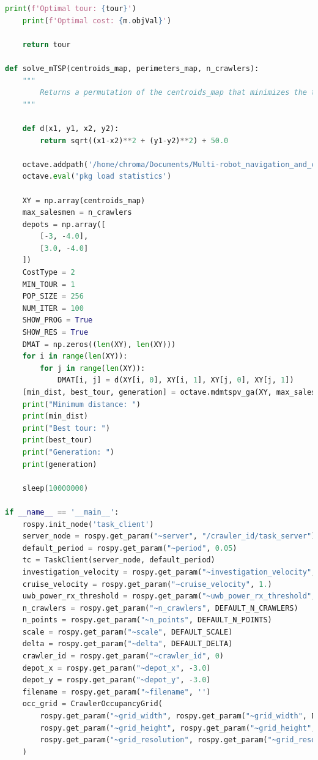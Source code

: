 \documentclass[francais,RandD]{rapportPFE}
\begin{document}
\begin{lstlisting}[language=Python,caption={Implémentation de l'algorithme d'investigation polygonale},label=lst:investigation_polygonale]
	print(f'Optimal tour: {tour}')
	print(f'Optimal cost: {m.objVal}')

	return tour

def solve_mTSP(centroids_map, perimeters_map, n_crawlers):
	"""
		Returns a permutation of the centroids_map that minimizes the total distance traveled by the crawlers
	"""

	def d(x1, y1, x2, y2):
		return sqrt((x1-x2)**2 + (y1-y2)**2) + 50.0

	octave.addpath('/home/chroma/Documents/Multi-robot_navigation_and_control_for_acoustic_inspection_of_metal_plate_structures/scripts/')
	octave.eval('pkg load statistics')

	XY = np.array(centroids_map)
	max_salesmen = n_crawlers
	depots = np.array([
		[-3, -4.0],
		[3.0, -4.0]
	])
	CostType = 2
	MIN_TOUR = 1
	POP_SIZE = 256
	NUM_ITER = 100
	SHOW_PROG = True
	SHOW_RES = True
	DMAT = np.zeros((len(XY), len(XY)))
	for i in range(len(XY)):
		for j in range(len(XY)):
			DMAT[i, j] = d(XY[i, 0], XY[i, 1], XY[j, 0], XY[j, 1])
	[min_dist, best_tour, generation] = octave.mdmtspv_ga(XY, max_salesmen, depots, CostType, MIN_TOUR, POP_SIZE, NUM_ITER, SHOW_PROG, SHOW_RES, DMAT, nout=3)
	print("Minimum distance: ")
	print(min_dist)
	print("Best tour: ")
	print(best_tour)
	print("Generation: ")
	print(generation)

	sleep(10000000)

if __name__ == '__main__':
	rospy.init_node('task_client')
	server_node = rospy.get_param("~server", "/crawler_id/task_server")
	default_period = rospy.get_param("~period", 0.05)
	tc = TaskClient(server_node, default_period)
	investigation_velocity = rospy.get_param("~investigation_velocity", 0.3)
	cruise_velocity = rospy.get_param("~cruise_velocity", 1.)
	uwb_power_rx_threshold = rospy.get_param("~uwb_power_rx_threshold", DEFAULT_UWB_POWER_RX_THRESHOLD)
	n_crawlers = rospy.get_param("~n_crawlers", DEFAULT_N_CRAWLERS)
	n_points = rospy.get_param("~n_points", DEFAULT_N_POINTS)
	scale = rospy.get_param("~scale", DEFAULT_SCALE)
	delta = rospy.get_param("~delta", DEFAULT_DELTA)
	crawler_id = rospy.get_param("~crawler_id", 0)
	depot_x = rospy.get_param("~depot_x", -3.0)
	depot_y = rospy.get_param("~depot_y", -3.0)
	filename = rospy.get_param("~filename", '')
	occ_grid = CrawlerOccupancyGrid(
		rospy.get_param("~grid_width", rospy.get_param("~grid_width", DEFAULT_GRID_WIDTH)),
		rospy.get_param("~grid_height", rospy.get_param("~grid_height", DEFAULT_GRID_HEIGHT)),
		rospy.get_param("~grid_resolution", rospy.get_param("~grid_resolution", DEFAULT_GRID_RESOLUTION))
	)


\end{lstlisting}
\end{document}
